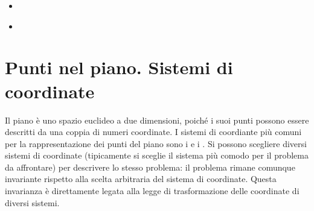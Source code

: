 \documentclass[letterpaper,10pt,italian]{jupyterBook}
\begin{document}
\sphinxAtStartPar
{}

\sphinxAtStartPar
{\hyperref[\detokenize{ch/analytic_geometry/analytic_geometry_2d/curves:geometry-analytic-2d-curves}]{}}
\begin{itemize}
\item {} 
\sphinxAtStartPar
{\hyperref[\detokenize{ch/analytic_geometry/analytic_geometry_2d/lines:geometry-analytic-2d-lines}]{}}

\item {} 
\sphinxAtStartPar
{\hyperref[\detokenize{ch/analytic_geometry/analytic_geometry_2d/conics:geometry-analytic-2d-conics}]{}}

\end{itemize}



\sphinxstepscope


\section{Punti nel piano. Sistemi di coordinate}
\label{\detokenize{ch/analytic_geometry/analytic_geometry_2d/coordinates:punti-nel-piano-sistemi-di-coordinate}}\label{\detokenize{ch/analytic_geometry/analytic_geometry_2d/coordinates:geometry-analytic-2d-coordinates}}\label{\detokenize{ch/analytic_geometry/analytic_geometry_2d/coordinates::doc}}
\sphinxAtStartPar
Il piano è uno spazio euclideo a due dimensioni, poiché i suoi punti possono essere descritti da una coppia di numeri \sphinxhyphen{} coordinate. I sistemi di coordiante più comuni per la rappresentazione dei punti del piano sono i  e i . Si possono scegliere diversi sistemi di coordinate (tipicamente si sceglie il sistema più comodo per il problema da affrontare) per descrivere lo stesso problema: il problema rimane comunque invariante rispetto alla scelta arbitraria del sistema di coordinate. Questa invarianza è direttamente legata alla legge di trasformazione delle coordinate di diversi sistemi.
\end{document}
